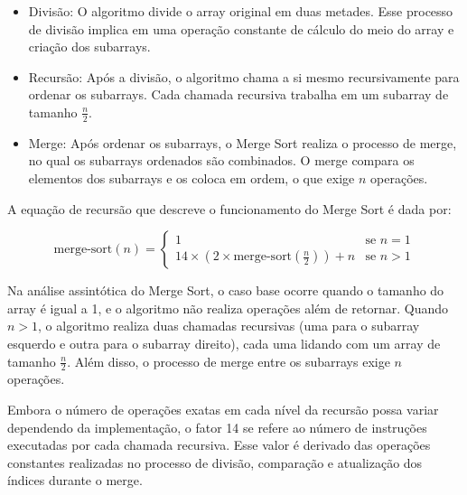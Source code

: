 \begin{itemize}
    \item Divisão: O algoritmo divide o array original em duas metades. Esse processo de divisão implica em uma operação constante de cálculo do meio do array e criação dos subarrays.
    \item Recursão: Após a divisão, o algoritmo chama a si mesmo recursivamente para ordenar os subarrays. Cada chamada recursiva trabalha em um subarray de tamanho \( \frac{n}{2} \).
    \item Merge: Após ordenar os subarrays, o Merge Sort realiza o processo de merge, no qual os subarrays ordenados são combinados. O merge compara os elementos dos subarrays e os coloca em ordem, o que exige \( n \) operações.
\end{itemize}

A equação de recursão que descreve o funcionamento do Merge Sort é dada por:

\[
\text{merge-sort}(n) = 
\begin{cases} 
1 & \text{se } n = 1 \\
14 \times \left( 2 \times \text{merge-sort}\left(\frac{n}{2}\right) \right) + n & \text{se } n > 1
\end{cases}
\]

Na análise assintótica do Merge Sort, o caso base ocorre quando o tamanho do array é igual a 1, e o algoritmo não realiza operações além de retornar. Quando \( n > 1 \), o algoritmo realiza duas chamadas recursivas (uma para o subarray esquerdo e outra para o subarray direito), cada uma lidando com um array de tamanho \( \frac{n}{2} \). Além disso, o processo de merge entre os subarrays exige \( n \) operações.

Embora o número de operações exatas em cada nível da recursão possa variar dependendo da implementação, o fator 14 se refere ao número de instruções executadas por cada chamada recursiva. Esse valor é derivado das operações constantes realizadas no processo de divisão, comparação e atualização dos índices durante o merge. 